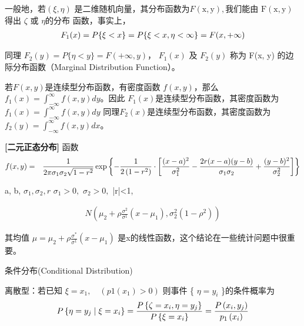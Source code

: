 \begin{enumerate}[1、]
		   一般地，若$ \left (  \xi, \eta  \right )  $ 是二维随机向量，其分布函数为$ F  (\mathrm{x}, \mathrm{y}),  $我们能由  $ \mathrm{F}(\mathrm{x}, \mathrm{y})  $ 得出  $ \zeta $ 或
		   $ \eta  $的分布 函数，事实上，
		   \begin{eqnarray}
		   F_{1}(x)  =  P\{\xi<x\}  =  P\{\xi<x, \eta<\infty\}  =  F(x,+\infty) \notag
		   \end{eqnarray}
		   
		   同理 $ F_{2}(y)=P\{\eta<y\}=F(+\infty, y) $， $ F_{1}(x)  $ 及 $  F_{2}(y) $  称为  F(x, y)  的边际分布函数（Marginal Distribution Function）。
		   
		   \begin{myexample} 
				若$ F(x,y) $是连续型分布函数，有密度函数 $ f(x,y) $，那么 $ f_{1}(x)=\int_{-\infty}^{\infty} f(x, y) d y $。因此 $ F_{1}(x) $是连续型分布函数，其密度函数为 $ f_{1}(x)=\int_{-\infty}^{\infty} f(x, y) d y $
				   同理$ F_{2}(x) $是连续型分布函数，其密度函数为 $ f_{2}(y)=\int_{-\infty}^{\infty} f(x, y) d x $。
		   \end{myexample}
		   
		   {\bf [二元正态分布]}  函数
		   \begin{eqnarray}
		   f(x, y) & = & \frac{1}{2 \pi \sigma_{1} \sigma_{2} \sqrt{1-r^{2}}} \exp \left\{-\frac{1}{2\left(1-r^{2}\right)} \cdot\left[\frac{(x-a)^{2}}{\sigma_{1}^{2}}-\frac{2 r(x-a)(y-b)}{\sigma_{1} \sigma_{2}}+\frac{(y-b)^{2}}{\sigma_{2}^{2}}\right]\right\} \notag
		   \end{eqnarray}
		   
		    a, b, $ \sigma_{1}, \sigma_{2}, r $  $ \sigma_{1}>0,$ \quad 
		   $ \sigma_{2}>0, $ \quad |r|<1, 
		   
		   \begin{theorem}[二元正态分布的边际分布仍为正态分布]	   	
		   	{ \begin{align*}
		   		N\left(\mu_{2}+\rho \frac{\sigma^{2}}{\sigma^{1}}\left(x-\mu_{1}\right), \sigma_{2}^{2}\left(1-\rho^{2}\right)\right)
		   		\end{align*}
		   	}	
		   \end{theorem}
	   
	      其均值 $ \mu=\mu_{2}+\rho \frac{\sigma^{*}}{\sigma^{1}}\left(x-\mu_{1}\right) $ 是x的线性函数，这个结论在一些统计问题中很重要。
	      
	      条件分布(Conditional Distribution)
	      	
	      离散型：若已知 $ \xi=x_{1}, \quad\left(p 1\left(x_{1}\right)>0\right) $ 则事件 \{ $ \eta = y_i$ \}的条件概率为
	      \vspace{-0.5em}
	      \begin{eqnarray}
	      P\left\{\eta  =  y_{j} \mid \xi  =  x_{i}\right\}  =  \frac{P\left\{\zeta  =  x_{i}, \eta  =  y_{j}\right\}}{P\left\{\xi  =  x_{i}\right\}} 
	      =  \frac{P\left(x_{i}, y_{j}\right)}{p_{1}\left(x_{i}\right)} \notag
	      \end{eqnarray}
	      

\end{enumerate}
